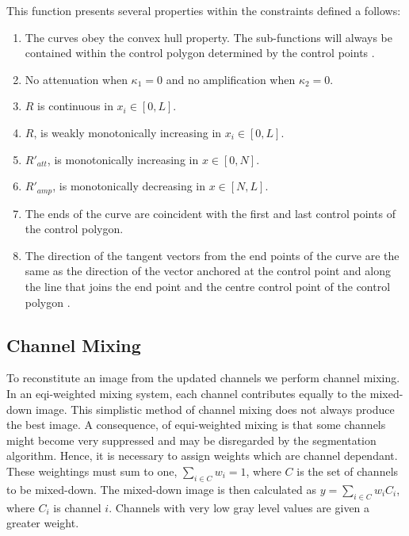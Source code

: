 \begin{definition}
This function presents several properties within the constraints defined a follows:
\begin{enumerate}
	\item
	The curves obey the convex hull property. The sub-functions will always be contained within the control polygon determined by the control points \citep{Vince2006,Marsh2005}.
	
	\item
	No attenuation when $\kappa_1=0$ and no amplification when $\kappa_2=0$.
	
	\item
	$R$ is continuous in $x_i \in [0,L]$.
	
	\item
	$R$, is weakly monotonically increasing in $x_i \in [0,L]$.
	
	\item
	$R'_{att}$, is monotonically increasing in $x \in [0, N]$.
	
	\item
	$R'_{amp}$, is monotonically decreasing in $x \in [N, L]$.
	
	\item
	The ends of the curve are coincident with the first and last control points of the control polygon.
	
	\item
	The direction of the tangent vectors from the end points of the curve are the same as the direction of the vector anchored at the control point and along the line that joins the end point and the centre control point of the control polygon \citep{Vince2006,Marsh2005}.
\end{enumerate}
\end{definition}



\subsection{Channel Mixing}
\label{sec:channelmixing}

To reconstitute an image from the updated channels we perform channel mixing. In an eqi-weighted mixing system, each channel contributes equally to the mixed-down image. This simplistic method of channel mixing does not always produce the best image.
A consequence, of equi-weighted mixing is that some channels might become very suppressed and may be disregarded by the segmentation algorithm. Hence, it is necessary to assign weights which are channel dependant. These weightings must sum to one, $\sum_{i \in C} w_i = 1$, where $C$ is the set of channels to be mixed-down. The mixed-down image is then calculated as $y = \sum_{i \in C}w_iC_i$, where $C_i$ is channel $i$. Channels with very low gray level values are given a greater weight.

